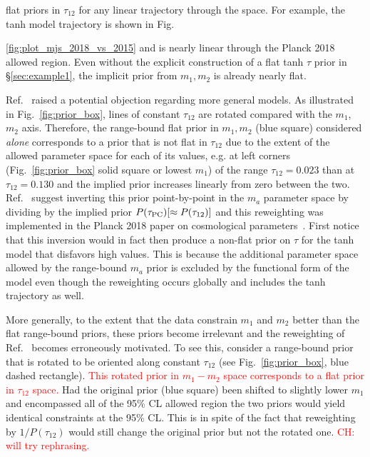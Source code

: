 \documentclass[prd,twocolumn,amsmath,amssymb,floatfix,superscriptaddress,nofootinbib]{revtex4-1}
\newcommand{\ch}[1]{\textcolor{red}{#1}}
\begin{document}
flat priors in $\tau_{12}$ for any linear trajectory through the space.   For example, the tanh model trajectory is shown in Fig.~{\ref{fig:plot_mjs_2018_vs_2015} and is nearly linear through the Planck 2018 allowed region.  Even without the explicit 
construction of a flat tanh $\tau$ prior in \S \ref{sec:example1}, 
the implicit prior from $m_1,m_2$ is already nearly flat. 

Ref.~\cite{Millea:2018bko} raised a potential objection regarding more general models.  As illustrated in Fig.~\ref{fig:prior_box}, lines of constant $\tau_{12}$ are rotated compared with the $m_1$,
$m_2$ axis.  Therefore, the range-bound flat prior in $m_1,m_2$ (blue square) considered {\it alone} corresponds to a prior that is not flat in $\tau_{12}$ due to the extent  of the allowed parameter space
for each of its values, e.g. at  left corners (Fig.~\ref{fig:prior_box} solid square or lowest $m_1$) of the range $\tau_{12}=0.023$
than at $\tau_{12} = 0.130$ and the implied prior increases linearly from zero between the two.   Ref.~\cite{Millea:2018bko} suggest 
inverting this prior point-by-point in the $m_a$ parameter space by dividing by the implied prior $P(\tau_{\rm PC}) [ \approx P(\tau_{12})]$ and this reweighting was implemented in the Planck 2018 paper on cosmological parameters~\cite{Aghanim:2018eyx}.
First notice that this inversion would in fact then produce a non-flat prior on $\tau$ for the tanh model
that disfavors high values.   This is because
the additional parameter space allowed by the range-bound $m_a$ prior is excluded by the functional form of the model even though the reweighting occurs globally and includes the tanh trajectory as well. 

More generally, to the extent that the data constrain $m_1$ and $m_2$ better than the flat range-bound priors, these priors become irrelevant and the reweighting of Ref.~\cite{Millea:2018bko} becomes erroneously motivated.   To see this, consider a range-bound prior that is rotated to be oriented along constant $\tau_{12}$ (see Fig.~\ref{fig:prior_box}, blue dashed rectangle). \ch{This rotated prior in $m_1-m_2$ space corresponds to a flat prior in $\tau_{12}$ space.}
Had the original prior (blue square) been shifted to slightly lower
$m_1$ and encompassed all of the 95\% CL allowed
region the two priors would yield  identical constraints at the
95\% CL.   This is in spite of the fact that reweighting by $1/P(\tau_{12})$ would still change the original prior but not the
rotated one.  \ch{CH: will try rephrasing.}

}
\end{document}
